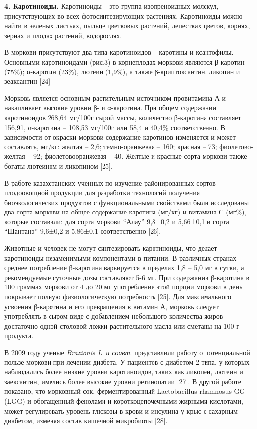 \begin{multicols}{2}
{\bfseries 4. Каротиноиды.} Каротиноиды -- это группа изопреноидных
молекул, присутствующих во всех фотосинтезирующих растениях. Каротиноиды
можно найти в зеленых листьях, пыльце цветковых растений, лепестках
цветов, корнях, зернах и плодах растений, водорослях.

В моркови присутствуют два типа каротиноидов -- каротины и ксантофилы.
Основными каротиноидами (рис.3) в корнеплодах моркови являются
β-каротин (75\%); α-каротин (23\%), лютеин (1,9\%), а также
β-криптоксантин, ликопин и зеаксантин {[}24{]}.

Морковь является основным растительным источником провитамина А и
накапливает высокие уровни β- и α-каротина. При общем содержании
каротиноидов 268,64 мг/100г сырой массы, количество β-каротина
составляет 156,91, α-каротина -- 108,53 мг/100г или 58,4 и 40,4\%
соответственно. В зависимости от окраски моркови содержание каротинов
изменяется и может составлять, мг/кг: желтая -- 2,6; темно-оранжевая --
160; красная -- 73; фиолетово-желтая -- 92; фиолетовооранжевая -- 40.
Желтые и красные сорта моркови также богаты лютеином и ликопином
{[}25{]}.


В работе казахстанских ученных по изучение районированных сортов
плодоовощной продукции для разработки технологий получения
биоэкологических продуктов с функциональными свойствами были исследованы
два сорта моркови на общее содержание каротина (мг/кг) и витамина С
(мг\%), которые составили: для сорта моркови ``Алау'' 9,8±0,2 и 5,66±0,1
и сорта ``Шантанэ'' 9,6±0,2 и 5,86±0,1 соответственно {[}26{]}.

Животные и человек не могут синтезировать каротиноиды, что делает
каротиноиды незаменимыми компонентами в питании. В различных странах
среднее потребление β-каротина варьируется в пределах 1,8 -- 5,0 мг в
сутки, а рекомендуемые суточные дозы составляют 5-6 мг. При содержании
β-каротина в 100 граммах моркови от 4 до 20 мг употребление этой порции
моркови в день покрывает полную физиологическую потребность {[}25{]}.
Для максимального усвоения β-каротина и его превращения в витамин А,
морковь следует употреблять в сыром виде с добавлением небольшого
количества жиров -- достаточно одной столовой ложки растительного масла
или сметаны на 100 г продукта.

В 2009 году ученые \emph{Brazionis L.} \emph{и соавт}. представлили
работу о потенциальной пользе моркови при лечении диабета. У пациентов с
диабетом 2 типа, у которых наблюдались более низкие уровни каротиноидов,
таких как ликопен, лютеин и заексантин, имелись более высокие уровни
ретинопатии {[}27{]}. В другой работе показано, что морковный сок,
ферментированный Lactobacillus rhamnosus GG (LGG) и обогащенный фенолами
и короткоцепочечными жирными кислотами, может регулировать уровень
глюкозы в крови и инсулина у крыс с сахарным диабетом, изменяя состав
кишечной микробиоты {[}28{]}.


\end{multicols}
